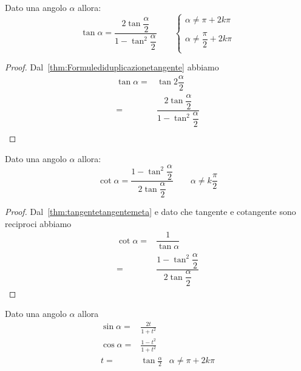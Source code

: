 \begin{thm}\label{thm:tangentetangentemeta}
	Dato una angolo $\alpha$  allora:
	\[\tan\alpha=\dfrac{2\tan\dfrac{\alpha}{2}}{1-\tan^2\dfrac{\alpha}{2}}\qquad\begin{cases}
	\alpha\neq\pi+2k\pi\\
	\\
	\alpha\neq\dfrac{\pi}{2}+2k\pi\\
	\end{cases}\]
\end{thm}
\begin{proof}
Dal~\vref{thm:Formulediduplicazionetangente} abbiamo
\begin{align*}
\tan\alpha=&\tan 2\dfrac{\alpha}{2}\\
=&\dfrac{2\tan\dfrac{\alpha}{2}}{1-\tan^2\dfrac{\alpha}{2}}\\
\end{align*}
\end{proof}
\begin{thm}\label{thm:cotangentetangentemeta}
	Dato una angolo $\alpha$  allora:
	\[\cot\alpha=\dfrac{1-\tan^2\dfrac{\alpha}{2}}{2\tan\dfrac{\alpha}{2}}\qquad\alpha\neq k\dfrac{\pi}{2}\]
\end{thm}
\begin{proof}
	Dal~\vref{thm:tangentetangentemeta} e dato che tangente e cotangente sono reciproci abbiamo
	\begin{align*}
	\cot\alpha=&\dfrac{1}{\tan\alpha}\\
	=&\dfrac{1-\tan^2\dfrac{\alpha}{2}}{2\tan\dfrac{\alpha}{2}}
	\end{align*}
\end{proof}
\begin{thm}\label{thm:formuleparametriche1}
	Dato una angolo $\alpha$  allora
\begin{align*}
\sin\alpha=&\frac{2t}{1+t^2}\\
\cos\alpha=&\frac{1-t^2}{1+t^2}\\
t=&\tan\frac{\alpha}{2}&\alpha\neq\pi+2k\pi
\end{align*}
\end{thm}
